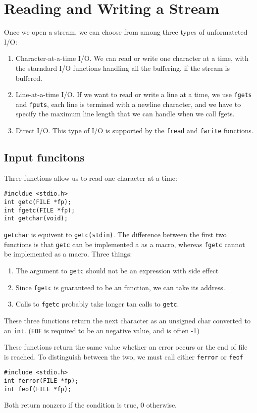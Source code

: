 \documentclass[a4paper,10pt]{book}
\begin{document}
\section{Reading and Writing a Stream}
Once we open a stream, we can choose from among three types of unformateted I/O:
\begin{enumerate}
\item Character-at-a-time I/O. We can read or write one character at a time,
with the starndard I/O functions handling all the buffering, if the stream is
buffered.
\item Line-at-a-time I/O. If we want to read or write a line at a time, we use
\verb|fgets| and \verb|fputs|, each line is termined with a newline character,
and we have to specify the maximum line length that we can handle when we call
fgets.
\item Direct I/O. This type of I/O is supported by the \verb|fread| and
\verb|fwrite| functions. 
\end{enumerate}

\subsection{Input funcitons}
Three functions allow us to read one character at a time:
\begin{verbatim}
#incldue <stdio.h>
int getc(FILE *fp);
int fgetc(FILE *fp);
int getchar(void);
\end{verbatim}
\verb|getchar| is equivent to \verb|getc(stdin)|. The difference between the
first two functions is that \verb|getc| can be implemented a as a macro, whereas
\verb|fgetc| cannot be implemented as a macro. Three things:
\begin{enumerate}
\item The argument to \verb|getc| should not be an expression with side effect
\item Since \verb|fgetc| is guaranteed to be an function, we can take its
address.
\item Calls to \verb|fgetc| probably take longer tan calls to \verb|getc|.
\end{enumerate}
These three functions return the next character as an unsigned char converted to
an \verb|int|. (\verb|EOF| is required to be an negative value, and is often -1)

These functions return the same value whether an error occurs or the end of file
is reached. To distinguish between the two, we must call either \verb|ferror| or
\verb|feof|
\begin{verbatim}
#include <stdio.h>
int ferror(FILE *fp);
int feof(FILE *fp);
\end{verbatim}
Both return nonzero if the condition is true, 0 otherwise. 
\end{document}
